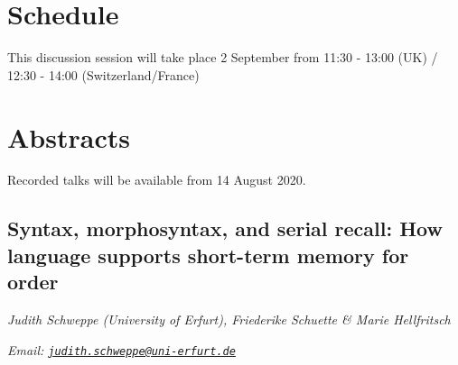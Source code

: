 \documentclass[12pt,]{book}
\begin{document}
\hypertarget{schedule-2}{%
\section{Schedule}\label{schedule-2}}

This discussion session will take place 2 September from 11:30 - 13:00 (UK) / 12:30 - 14:00 (Switzerland/France)

\hypertarget{abstracts-2}{%
\section{Abstracts}\label{abstracts-2}}

Recorded talks will be available from 14 August 2020.

\hypertarget{syntax-morphosyntax-and-serial-recall-how-language-supports-short-term-memory-for-order}{%
\subsection{Syntax, morphosyntax, and serial recall: How language supports short-term memory for order}\label{syntax-morphosyntax-and-serial-recall-how-language-supports-short-term-memory-for-order}}

\emph{Judith Schweppe (University of Erfurt), Friederike Schuette \& Marie Hellfritsch}

\emph{Email: \href{mailto:judith.schweppe@uni-erfurt.de}{\nolinkurl{judith.schweppe@uni-erfurt.de}}}
\end{document}
